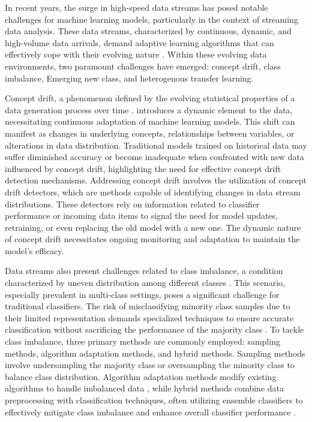 In recent years, the surge in high-speed data streams has posed notable challenges for machine learning models, particularly in the context of streaming data analysis. These data streams, characterized by continuous, dynamic, and high-volume data arrivals, demand adaptive learning algorithms that can effectively cope with their evolving nature \cite{yang2021concept} \cite{dong2019multistream} \cite{shan2018online}. Within these evolving data environments, two paramount challenges have emerged: concept drift, class imbalance, Emerging new class, and heterogenous transfer learning.

Concept drift, a phenomenon defined by the evolving statistical properties of a data generation process over time \cite{pan2009survey} \cite{zhuang2020comprehensive}. introduces a dynamic element to the data, necessitating continuous adaptation of machine learning models. This shift can manifest as changes in underlying concepts, relationships between variables, or alterations in data distribution. Traditional models trained on historical data may suffer diminished accuracy or become inadequate when confronted with new data influenced by concept drift, highlighting the need for effective concept drift detection mechanisms. Addressing concept drift involves the utilization of concept drift detectors, which are methods capable of identifying changes in data stream distributions. These detectors rely on information related to classifier performance or incoming data items to signal the need for model updates, retraining, or even replacing the old model with a new one. The dynamic nature of concept drift necessitates ongoing monitoring and adaptation to maintain the model's efficacy.

Data streams also present challenges related to class imbalance, a condition characterized by uneven distribution among different classes \cite{wang2018systematic} \cite{sun2009classification}. This scenario, especially prevalent in multi-class settings, poses a significant challenge for traditional classifiers. The risk of misclassifying minority class samples due to their limited representation demands specialized techniques to ensure accurate classification without sacrificing the performance of the majority class \cite{charte2015addressing} \cite{charte2015mlsmote} \cite{daniels2017addressing} \cite{liu2018making}. To tackle class imbalance, three primary methods are commonly employed: sampling methods, algorithm adaptation methods, and hybrid methods. Sampling methods involve undersampling the majority class or oversampling the minority class to balance class distribution. Algorithm adaptation methods modify existing algorithms to handle imbalanced data \cite{japkowicz1995novelty} \cite{lopez2012analysis} \cite{zhang2020towards}, while hybrid methods combine data preprocessing with classification techniques, often utilizing ensemble classifiers to effectively mitigate class imbalance and enhance overall classifier performance \cite{chawla2003smoteboost} \cite{wang2010negative} \cite{galar2011review} \cite{cruz2018dynamic}.

